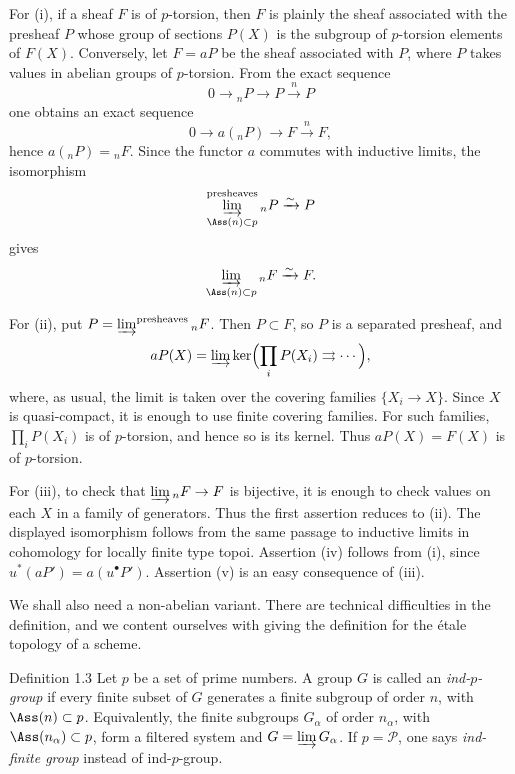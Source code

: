 \begin{prooftext}
For (i), if a sheaf \(F\) is of \(p\)-torsion, then \(F\) is plainly the sheaf associated with the presheaf \(P\) whose group of sections \(P(X)\) is the subgroup of \(p\)-torsion elements of \(F(X)\). Conversely, let \(F=aP\) be the sheaf associated with \(P\), where \(P\) takes values in abelian groups of \(p\)-torsion. From the exact sequence
\[
0\longrightarrow {}_nP\longrightarrow P\xrightarrow{n}P
\]
one obtains an exact sequence
\[
0\longrightarrow a({}_nP)\longrightarrow F\xrightarrow{n}F,
\]
hence \(a({}_nP)={}_nF\). Since the functor \(a\) commutes with inductive limits, the isomorphism
\[
\varinjlim_{\Ass(n)\subset p}^{\mathrm{presheaves}}{}_nP\xrightarrow{\sim}P
\]
gives
\[
\varinjlim_{\Ass(n)\subset p}{}_nF\xrightarrow{\sim}F.
\]

For (ii), put \(P=\varinjlim^{\mathrm{presheaves}}{}_nF\). Then \(P\subset F\), so \(P\) is a separated presheaf, and
\[
aP(X)=\varinjlim \ker\Bigl(\prod_iP(X_i)\rightrightarrows\cdots\Bigr),
\]
where, as usual, the limit is taken over the covering families \(\{X_i\to X\}\). Since \(X\) is quasi-compact, it is enough to use finite covering families. For such families, \(\prod_iP(X_i)\) is of \(p\)-torsion, and hence so is its kernel. Thus \(aP(X)=F(X)\) is of \(p\)-torsion.

For (iii), to check that \(\varinjlim {}_nF\to F\) is bijective, it is enough to check values on each \(X\) in a family of generators. Thus the first assertion reduces to (ii). The displayed isomorphism follows from the same passage to inductive limits in cohomology for locally finite type topoi. Assertion (iv) follows from (i), since \(u^*(aP')=a(u^\bullet P')\). Assertion (v) is an easy consequence of (iii).
\end{prooftext}

We shall also need a non-abelian variant. There are technical difficulties in the definition, and we content ourselves with giving the definition for the \'etale topology of a scheme.

\begin{statement}{Definition 1.3}
Let \(p\) be a set of prime numbers. A group \(G\) is called an \emph{ind-\(p\)-group} if every finite subset of \(G\) generates a finite subgroup of order \(n\), with \(\Ass(n)\subset p\). Equivalently, the finite subgroups \(G_\alpha\) of order \(n_\alpha\), with \(\Ass(n_\alpha)\subset p\), form a filtered system and \(G=\varinjlim G_\alpha\). If \(p=\mathcal P\), one says \emph{ind-finite group} instead of ind-\(p\)-group.
\end{statement}

